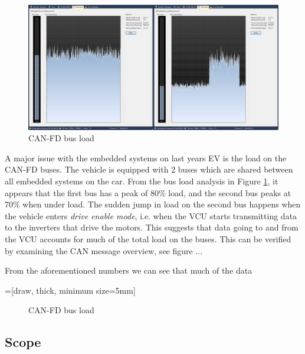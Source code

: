 \begin{figure}[h!]
    \centering
    \includegraphics[width=\textwidth]{media/canfd-load.png}
    \caption{CAN-FD bus load}
    \label{fig:canfd_load}
\end{figure}

A major issue with the embedded systems on last years EV is the load on the CAN-FD buses. The vehicle is equipped with 2 buses which are shared between all embedded systems on the car. From the bus load analysis in Figure \ref{fig:canfd_load}, it appears that the first bus has a peak of 80\% load, and the second bus peaks at 70\% when under load. The sudden jump in load on the second bus happens when the vehicle enters \emph{drive enable mode}, i.e. when the VCU starts transmitting data to the inverters that drive the motors. This suggests that data going to and from the VCU accounts for much of the total load on the buses. This can be verified by examining the CAN message overview, see figure ... 

From the aforementioned numbers we can see that much of the data 


=[draw, thick, minimum size=5mm]

\begin{figure}[h!]
    \centering
    \caption{CAN-FD bus load}
    \label{fig:canfd}
\end{figure}

\subsection{Scope}

